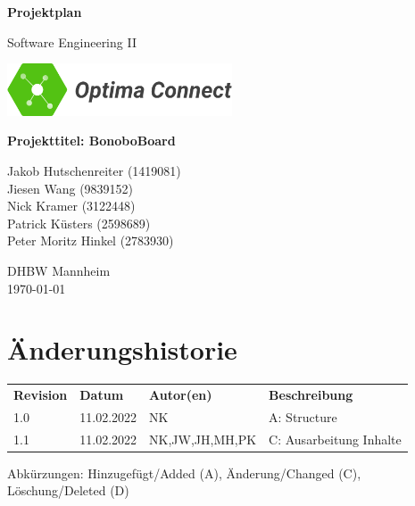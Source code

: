 \documentclass[a4paper,11pt]{scrartcl}
\begin{document}
\renewcommand*{\arraystretch}{1.2}
\begin{titlepage}
    \begin{center}
        \vspace*{1cm}\Huge
        \textbf{Projektplan}\par                
        \vspace{0.5cm}\LARGE        
        Software Engineering II\par           
        \vspace{2cm}
        \includegraphics[width=0.5\textwidth]{OptimaLogo_long}\par   
        \vspace{1cm}
        \textbf{Projekttitel: BonoboBoard}\par        
        \vfill\Large   
        Jakob Hutschenreiter (1419081)\\Jiesen Wang (9839152)\\Nick Kramer (3122448)\\Patrick Küsters (2598689)\\Peter Moritz Hinkel (2783930)\par
        \vspace{2cm}
        DHBW Mannheim\\
        \today     
    \end{center}
\end{titlepage}

\section*{Änderungshistorie}
\begin{table}[h]
	\begin{tabular}{@{} p{20mm} p{25mm} p{35mm} p{75mm}}
		\textbf{Revision} & \textbf{Datum} & \textbf{Autor(en)} & \textbf{Beschreibung}\\
		1.0 & 11.02.2022 & NK & A: Structure\\
		1.1 & 11.02.2022 & NK,JW,JH,MH,PK & C: Ausarbeitung Inhalte\\
	\end{tabular}
\end{table}
\noindent
Abkürzungen: Hinzugefügt/Added (A), Änderung/Changed (C), Löschung/Deleted (D)
\vspace{2cm}
\tableofcontents
\newpage
{}
\end{document}
